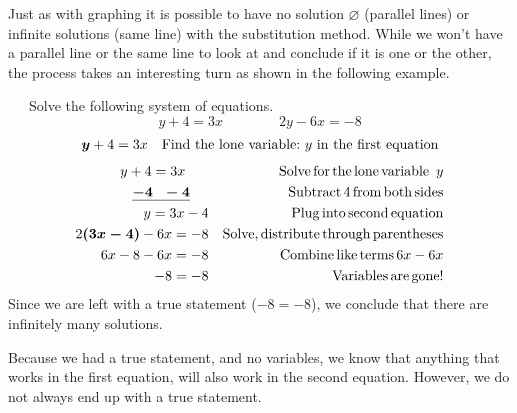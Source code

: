 Just as with graphing it is possible to have no solution $\varnothing$
(parallel lines) or infinite solutions (same line) with the substitution
method. While we won't have a parallel line or the same line to look at and
conclude if it is one or the other, the process takes an interesting turn as
shown in the following example.

\begin{example}~~~Solve the following system of equations.
$$y + 4 = 3 x\qquad\qquad 2 y - 6 x = - 8$$
  \begin{eqnarray*}
    \boldsymbol{y} + 4 = 3 x &  & \text{Find~the~lone~variable:~} y
    \text{~in~the~first~equation}\\
  \end{eqnarray*}
  \begin{eqnarray*}
  	y + 4 = 3 x~~~~~ &  & \operatorname{Solve} \operatorname{for} \operatorname{the} \operatorname{lone}
    \operatorname{variable~} y\\
    \boldsymbol{\underline{- 4 ~~- 4}}~~~~ &  & \operatorname{Subtract} 4 \operatorname{from} \operatorname{both} \operatorname{sides} \\
		y = 3 x - 4 &  & \operatorname{Plug} \operatorname{into} \operatorname{second}
    \operatorname{equation}\\
	  2 \boldsymbol{(3 x - 4)} - 6 x = - 8 &  & \operatorname{Solve}, \operatorname{distribute}
    \operatorname{through} \operatorname{parentheses}\\
    6 x - 8 - 6 x = - 8 &  & \operatorname{Combine} \operatorname{like} \operatorname{terms} 6 x - 6x\\
    - 8 = - 8 &  & \operatorname{Variables} \operatorname{are} \operatorname{gone} !
  \end{eqnarray*}
Since we are left with a true statement ($-8=-8$), we conclude that there are infinitely many solutions.
\end{example}

Because we had a true statement, and no variables, we know that anything that
works in the first equation, will also work in the second equation. However,
we do not always end up with a true statement.

